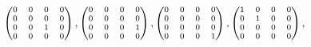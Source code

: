 \documentclass[11pt]{article}
\begin{document}
      \vspace{-2mm}                  
$  \hspace{13mm}  \scriptsize{           \begin{pmatrix}
                        0&0&0&0\\
                        0&0&0&0\\
                        0&0&1&0\\
                        0&0&0&0\\
                        \end{pmatrix},
                        \begin{pmatrix}
                        0&0&0&0\\
                        0&0&0&0\\
                        0&0&0&1\\
                        0&0&0&0\\
                        \end{pmatrix},
                        \begin{pmatrix}
                        0&0&0&0\\
                        0&0&0&0\\
                        0&0&0&0\\
                        0&0&0&1\\
                        \end{pmatrix},
                   \begin{pmatrix}
                        1&0&0&0\\
                        0&1&0&0\\
                        0&0&0&0\\
                        0&0&0&0\\
                        \end{pmatrix},}$\\[4pt]
             
\end{document}
